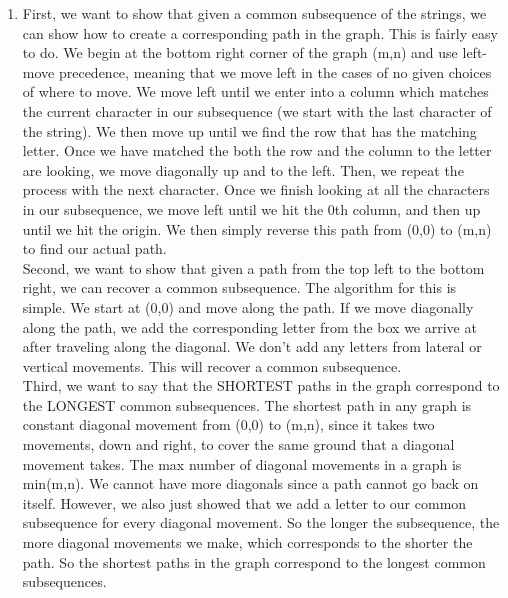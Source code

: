 \documentclass[12pt]{article}
\begin{document}
\begin{enumerate}[label=(\alph*)]
    \item First, we want to show that given a common subsequence of the strings, we can show how to create a corresponding path in the graph. This is fairly easy to do. We begin at the bottom right corner of the graph (m,n) and use left-move precedence, meaning that we move left in the cases of no given choices of where to move. We move left until we enter into a column which matches the current character in our subsequence (we start with the last character of the string). We then move up until we find the row that has the matching letter. Once we have matched the both the row and the column to the letter are looking, we move diagonally up and to the left. Then, we repeat the process with the next character. Once we finish looking at all the characters in our subsequence, we move left until we hit the 0th column, and then up until we hit the origin. We then simply reverse this path from (0,0) to (m,n) to find our actual path.\\

    Second, we want to show that given a path from the top left to the bottom right, we can recover a common subsequence. The algorithm for this is simple. We start at (0,0) and move along the path. If we move diagonally along the path, we add the corresponding letter from the box we arrive at after traveling along the diagonal. We don't add any letters from lateral or vertical movements. This will recover a common subsequence.\\

    Third, we want to say that the SHORTEST paths in the graph correspond to the LONGEST common subsequences. The shortest path in any graph is constant diagonal movement from (0,0) to (m,n), since it takes two movements, down and right, to cover the same ground that a diagonal movement takes. The max number of diagonal movements in a graph is min(m,n). We cannot have more diagonals since a path cannot go back on itself. However, we also just showed that we add a letter to our common subsequence for every diagonal movement. So the longer the subsequence, the more diagonal movements we make, which corresponds to the shorter the path. So the shortest paths in the graph correspond to the longest common subsequences.\\


\end{enumerate}
\end{document}
